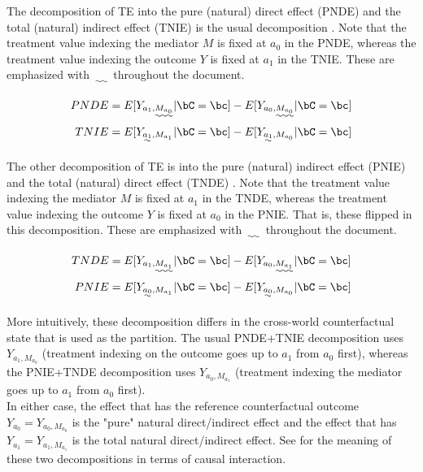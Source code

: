 \documentclass[dvipdfmx,10pt]{article}
\begin{document}
The decomposition of TE into the pure (natural) direct effect (PNDE) and the total (natural) indirect effect (TNIE) is the usual decomposition \cite{pearlDirectIndirectEffects2001}. Note that the treatment value indexing the mediator \(M\) is fixed at \(a_{0}\) in the PNDE, whereas the treatment value indexing the outcome \(Y\) is fixed at \(a_{1}\) in the TNIE. These are emphasized with \(\uwave{~~~~}\) throughout the document.

\begin{align*}
  PNDE &= E[Y_{a_{1},\uwave{M_{a_{0}}}} | \bC = \bc] - E[Y_{a_{0},\uwave{M_{a_{0}}}} | \bC = \bc]\\
  TNIE &= E[Y_{\uwave{a_{1}},M_{a_{1}}} | \bC = \bc] - E[Y_{\uwave{a_{1}},M_{a_{0}}} | \bC = \bc]\\
\end{align*}

The other decomposition of TE is into the pure (natural) indirect effect (PNIE) and the total (natural) direct effect (TNDE) \cite{robinsIdentifiabilityExchangeabilityDirect1992}. Note that the treatment value indexing the mediator \(M\) is fixed at \(a_{1}\) in the TNDE, whereas the treatment value indexing the outcome \(Y\) is fixed at \(a_{0}\) in the PNIE. That is, these flipped in this decomposition. These are emphasized with \(\uwave{~~~~}\) throughout the document.

\begin{align*}
  TNDE &= E[Y_{a_{1},\uwave{M_{a_{1}}}} | \bC = \bc] - E[Y_{a_{0},\uwave{M_{a_{1}}}} | \bC = \bc]\\
  PNIE &= E[Y_{\uwave{a_{0}},M_{a_{1}}} | \bC = \bc] - E[Y_{\uwave{a_{0}},M_{a_{0}}} | \bC = \bc]\\
\end{align*}

More intuitively, these decomposition differs in the cross-world counterfactual state that is used as the partition. The usual PNDE+TNIE decomposition uses \(Y_{a_{1},M_{a_{0}}}\) (treatment indexing on the outcome goes up to \(a_{1}\) from \(a_{0}\) first), whereas the PNIE+TNDE decomposition uses \(Y_{a_{0},M_{a_{1}}}\) (treatment indexing the mediator goes up to \(a_{1}\) from \(a_{0}\) first).\\

In either case, the effect that has the reference counterfactual outcome \(Y_{a_{0}} = Y_{a_{0},M_{a_{0}}}\) is the "pure" natural direct/indirect effect and the effect that has \(Y_{a_{1}} = Y_{a_{1},M_{a_{1}}}\) is the total natural direct/indirect effect. See \cite{vanderweeleThreewayDecompositionTotal2013} for the meaning of these two decompositions in terms of causal interaction.\\
\end{document}
